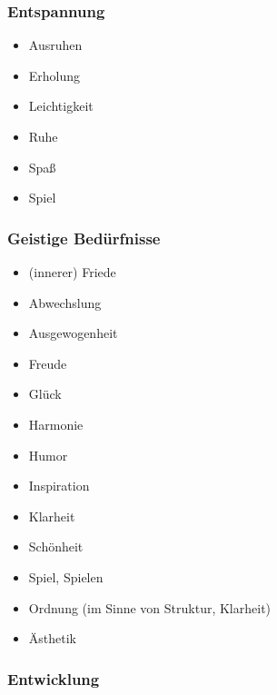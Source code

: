 \subsubsection{Entspannung}

\begin{multicols}{2}
  \begin{itemize}
    \item Ausruhen
    \item Erholung
    \item Leichtigkeit
    \item Ruhe
    \item Spaß
    \item Spiel
  \end{itemize}
\end{multicols}


\subsubsection{Geistige Bedürfnisse}

\begin{multicols}{2}
  \begin{itemize}
    \item (innerer) Friede
    \item Abwechslung
    \item Ausgewogenheit
    \item Freude
    \item Glück
    \item Harmonie
    \item Humor
    \item Inspiration
    \item Klarheit
    \item Schönheit
    \item Spiel, Spielen
    \item \glqq Ordnung\grqq{} (im Sinne von Struktur, Klarheit)
    \item Ästhetik
  \end{itemize}
\end{multicols}


\subsubsection{Entwicklung}

